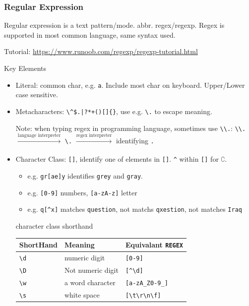 \subsubsection{Regular Expression}
    Regular expression is a text pattern/mode. abbr. regex/regexp. Regex is supported in most common language, same syntax used.

    Tutorial: \url{https://www.runoob.com/regexp/regexp-tutorial.html}

\begin{point}
    Key Elements
\end{point}

\begin{itemize}[topsep=2pt,itemsep=0pt]
    \item Literal: common char, e.g. \lstinline|a|. Include most char on keyboard. Upper/Lower case sensitive.
    \item Metacharacters: \lstinline!\^$.|?*+()[]{}!, use e.g. \lstinline|\.| to escape meaning.
    
    Note: when typing regex in programming language, sometimes use \lstinline|\\.|: \lstinline|\\.| $ \xrightarrow[]{\text{language interpreter}}  $ \lstinline|\.| $ \xrightarrow[]{\text{regex interpreter}}  $ identifying \lstinline|.|

    \item Character Class: \lstinline|[]|, identify one of elements in \lstinline|[]|. \lstinline|^| within \lstinline|[]| for $ \complement $. 
    \begin{itemize}[topsep=2pt,itemsep=0pt]
        \item e.g. \lstinline|gr[ae]y| identifies \lstinline|grey| and \lstinline|gray|.
        \item e.g. \lstinline|[0-9]| numbers, \lstinline|[a-zA-z]| letter
        \item e.g. \lstinline|q[^x]| matches \lstinline|question|, not matchs \lstinline|qxestion|, not matches \lstinline|Iraq|
    \end{itemize}

    character class shorthand
\begin{table}[H]
    \centering
    \renewcommand\arraystretch{1.15}
    \begin{tabular}{lll}
        \hline
        ShortHand&Meaning&Equivalant \lstinline|REGEX|\\
        \hline
        \lstinline|\d|&numeric digit&\lstinline|[0-9]|\\
        \lstinline|\D|&Not numeric digit&\lstinline|[^\d]|\\
        \lstinline|\w|&a word character&\lstinline|[a-zA_Z0-9_]|\\
        \lstinline|\s|&white space&\lstinline|[\t\r\n\f]|\\
        \hline
    \end{tabular}
\end{table}


\end{itemize}
